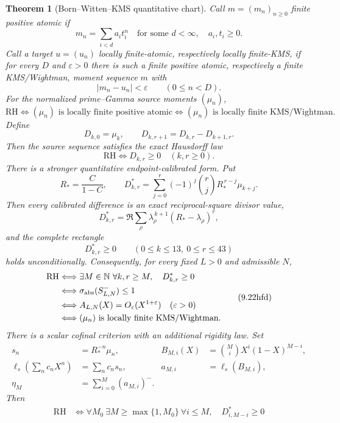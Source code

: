 \documentclass[11pt]{article}
\newtheorem{theorem}{Theorem}[section]
\begin{document}
\begin{theorem}[Born--Witten--KMS quantitative chart]
Call \(m=(m_n)_{n\ge0}\) finite positive atomic if
\[
 m_n=\sum_{i<d}a_i t_i^n
 \quad\text{for some }d<\infty,\quad a_i,t_i\ge0.
 \tag{9.22hb}
\]
Call a target \(u=(u_n)\) locally finite-atomic, respectively locally finite-KMS, if for every
\(D\) and \(\varepsilon>0\) there is such a finite positive atomic, respectively a finite
KMS/Wightman, moment sequence \(m\) with
\[
 |m_n-u_n|<\varepsilon\qquad(0\le n<D).
 \tag{9.22hc}
\]
For the normalized prime--Gamma source moments \((\mu_n)\),
\[
 \mathrm{RH}
 \Longleftrightarrow(\mu_n)\text{ is locally finite positive atomic}
 \Longleftrightarrow(\mu_n)\text{ is locally finite KMS/Wightman}.
 \tag{9.22hd}
\]
Define
\[
 D_{k,0}=\mu_k,\qquad D_{k,r+1}=D_{k,r}-D_{k+1,r}.
 \tag{9.22he}
\]
Then the source sequence satisfies the exact Hausdorff law
\[
 \mathrm{RH}\Longleftrightarrow D_{k,r}\ge0\quad(k,r\ge0).
 \tag{9.22hf}
\]
There is a stronger quantitative endpoint-calibrated form.  Put
\[
 R_*=\frac{C}{1-C},\qquad
 D^*_{k,r}=\sum_{j=0}^r(-1)^j\binom rj
 R_*^{\,r-j}\mu_{k+j}.
 \tag{9.22hfa}
\]
Then every calibrated difference is an exact reciprocal-square divisor value,
\[
 D^*_{k,r}=\Re\sum_\rho
 \lambda_\rho^{\,k+1}(R_*-\lambda_\rho)^r,
 \tag{9.22hfb}
\]
and the complete rectangle
\[
 D^*_{k,r}\ge0\qquad(0\le k\le13,\ 0\le r\le43)
 \tag{9.22hfc}
\]
holds unconditionally.  Consequently, for every fixed $L>0$ and admissible $N$,
\[
 \begin{aligned}
 \mathrm{RH}
 &\Longleftrightarrow
 \exists M\in\mathbb N\ \forall k,r\ge M,\quad D^*_{k,r}\ge0\\
 &\Longleftrightarrow
 \sigma_{\rm abs}(S_{L,N}^-)\le1\\
 &\Longleftrightarrow
 A_{L,N}(X)=O_\varepsilon(X^{1+\varepsilon})\quad(\varepsilon>0)\\
 &\Longleftrightarrow
 (\mu_n)\text{ is locally finite KMS/Wightman}.
 \end{aligned}
 \tag{9.22hfd}
\]
There is a scalar cofinal criterion with an additional rigidity law.  Set
\[
 \begin{aligned}
 s_n&=R_*^{-n}\mu_n,&
 B_{M,i}(X)&=\binom MiX^i(1-X)^{M-i},\\
 \ell_s\!\left(\sum_nc_nX^n\right)&=\sum_nc_ns_n,&
 a_{M,i}&=\ell_s(B_{M,i}),\\
 \eta_M&=\sum_{i=0}^M(a_{M,i})^-.
 \end{aligned}
 \tag{9.22hfe}
\]
Then
\[
 \boxed{\begin{aligned}
 \mathrm{RH}
 &\Longleftrightarrow
 \forall M_0\ \exists M\ge\max\{1,M_0\}\ \forall i\le M,
       \quad D^*_{i,M-i}\ge0\\

\end{aligned}}\]
\end{theorem}
\end{document}
